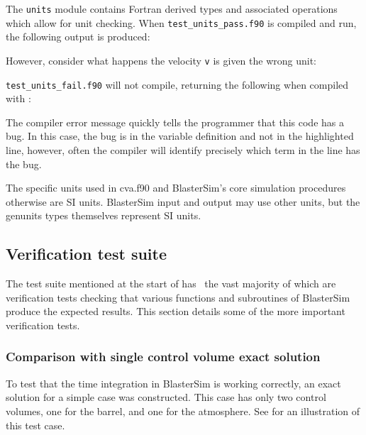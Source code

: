 The \texttt{units} module contains Fortran derived types and associated operations which allow for unit checking.
When \texttt{test\_units\_pass.f90} is compiled and run, the following output is produced:


However, consider what happens the velocity \texttt{v} is given the wrong unit:


\texttt{test\_units\_fail.f90} will not compile, returning the following when compiled with \unskip:


The compiler error message quickly tells the programmer that this code has a bug.
In this case, the bug is in the variable definition and not in the highlighted line, however, often the compiler will identify precisely which term in the line has the bug.

The specific units used in cva.f90 and BlasterSim's core simulation procedures otherwise are SI units.
BlasterSim input and output may use other units, but the genunits types themselves represent SI units.

\subsection{Verification test suite}

The test suite mentioned at the start of  has \totaltests\, the vast majority of which are verification tests checking that various functions and subroutines of BlasterSim produce the expected results.
This section details some of the more important verification tests.

\subsubsection{Comparison with single control volume exact solution}\label{single-cv-exact}

To test that the time integration in BlasterSim is working correctly, an exact solution for a simple case was constructed.
This case has only two control volumes, one for the barrel, and one for the atmosphere.
See  for an illustration of this test case.



